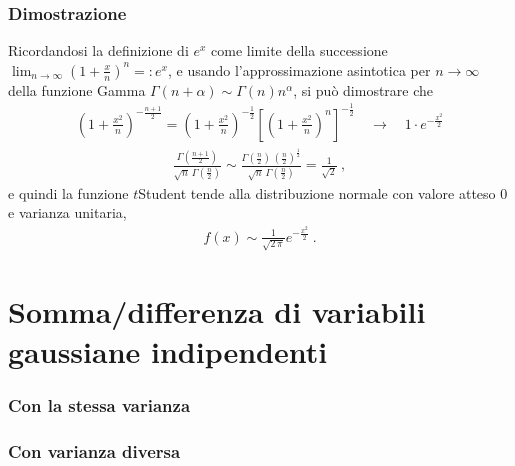 \documentclass[letterpaper,10pt,italian]{jupyterBook}
\begin{document}
\subsubsection*{Dimostrazione}

\sphinxAtStartPar
Ricordandosi la definizione di \(e^x\) come limite della successione \(\lim_{n \rightarrow \infty} \left( 1 + \frac{x}{n} \right)^n =: e^x\), e usando l’approssimazione asintotica per \(n \rightarrow \infty\) della funzione Gamma \(\Gamma(n+\alpha) \sim \Gamma(n)n^{\alpha}\), si può dimostrare che
\begin{equation*}
\begin{split}\left( 1 + \frac{x^2}{n} \right)^{-\frac{n+1}{2}} = \left( 1 + \frac{x^2}{n} \right)^{-\frac{1}{2}} \left[ \left( 1 + \frac{x^2}{n} \right)^n \right]^{-\frac{1}{2}} \quad \rightarrow \quad 1 \cdot e^{-\frac{x^2}{2}}\end{split}
\end{equation*}\begin{equation*}
\begin{split}\frac{\Gamma\left(\frac{n+1}{2}\right)}{\sqrt{n} \, \Gamma\left( \frac{n}{2} \right)} \sim
  \frac{\Gamma\left(\frac{n}{2}\right) \, \left(\frac{n}{2}\right)^{\frac{1}{2}}}{\sqrt{n} \, \Gamma\left( \frac{n}{2} \right)} = \frac{1}{\sqrt{2}} \ , \end{split}
\end{equation*}
\sphinxAtStartPar
e quindi la funzione \(t\)\sphinxhyphen{}Student tende alla distribuzione normale con valore atteso \(0\) e varianza unitaria,
\begin{equation*}
\begin{split}f(x) \sim \frac{1}{\sqrt{2 \,\pi}} e^{-\frac{x^2}{2}} \ .\end{split}
\end{equation*}

\section{Somma/differenza di variabili gaussiane indipendenti}
\label{\detokenize{ch/proofs:somma-differenza-di-variabili-gaussiane-indipendenti}}\label{\detokenize{ch/proofs:proof-gauss-independent-sum}}\subsubsection*{Con la stessa varianza}

\sphinxAtStartPar
{}


\subsubsection*{Con varianza diversa}
\end{document}
